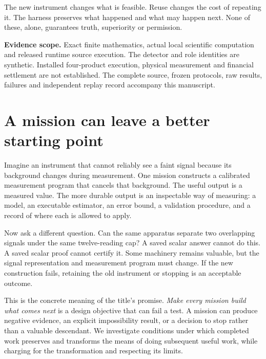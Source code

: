 \documentclass[11pt]{article}
\begin{document}
\begin{insight}[title={The result to remember}]
The new instrument changes what is feasible. Reuse changes the cost of repeating it.\newline
The harness preserves what happened and what may happen next.\newline
None of these, alone, guarantees truth, superiority or permission.
\end{insight}

\noindent\textbf{Evidence scope.} Exact finite mathematics, actual local scientific computation and released runtime source execution. The detector and role identities are synthetic. Installed four-product execution, physical measurement and financial settlement are not established. The complete source, frozen protocols, raw results, failures and independent replay record accompany this manuscript.



\section{A mission can leave a better starting point}
\label{sec:opening}

Imagine an instrument that cannot reliably see a faint signal because its background changes during measurement. One mission constructs a calibrated measurement program that cancels that background. The useful output is a measured value. The more durable output is an inspectable way of measuring: a model, an executable estimator, an error bound, a validation procedure, and a record of where each is allowed to apply.

Now ask a different question. Can the same apparatus separate two overlapping signals under the same twelve-reading cap? A saved scalar answer cannot do this. A saved scalar proof cannot certify it. Some machinery remains valuable, but the signal representation and measurement program must change. If the new construction fails, retaining the old instrument or stopping is an acceptable outcome.

This is the concrete meaning of the title's promise. \emph{Make every mission build what comes next} is a design objective that can fail a test. A mission can produce negative evidence, an explicit impossibility result, or a decision to stop rather than a valuable descendant. We investigate conditions under which completed work preserves and transforms the means of doing subsequent useful work, while charging for the transformation and respecting its limits.
\end{document}
